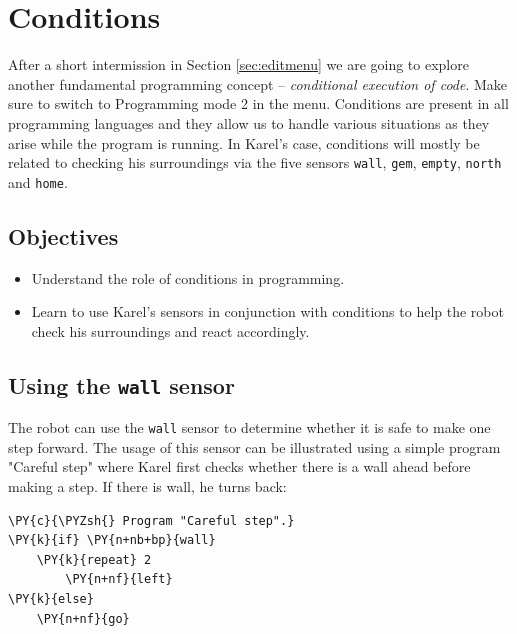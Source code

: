 
\section{Conditions} \label{sec:cond}

After a short intermission in Section \ref{sec:editmenu} we are going to explore
another fundamental programming concept -- {\em conditional execution of code}. Make
sure to switch to Programming mode 2 in the menu. Conditions 
are present in all programming languages and they allow us to 
handle various situations as they arise while the program is running. In Karel's case, 
conditions will mostly be related to checking his surroundings via the five sensors
{\tt wall}, {\tt gem}, {\tt empty}, {\tt north} and {\tt home}.

\subsection{Objectives} 

\begin{itemize}
\item Understand the role of conditions in programming.
\item Learn to use Karel's sensors in conjunction with conditions to help the robot
      check his surroundings and react accordingly. 
\end{itemize}

\subsection{Using the {\tt wall} sensor}

The robot can use the {\tt wall} sensor to determine 
whether it is safe to make one step forward.
The usage of this sensor can be illustrated 
using a simple program "Careful step" 
where Karel first checks whether there is a wall ahead before
making a step. If there is wall, he turns back:\\

\begin{bbox}
\begin{Verbatim}[commandchars=\\\{\}]
\PY{c}{\PYZsh{} Program "Careful step".}
\PY{k}{if} \PY{n+nb+bp}{wall}
    \PY{k}{repeat} 2
        \PY{n+nf}{left}
\PY{k}{else}
    \PY{n+nf}{go}
\end{Verbatim}
\end{bbox}
\vspace{6mm}

